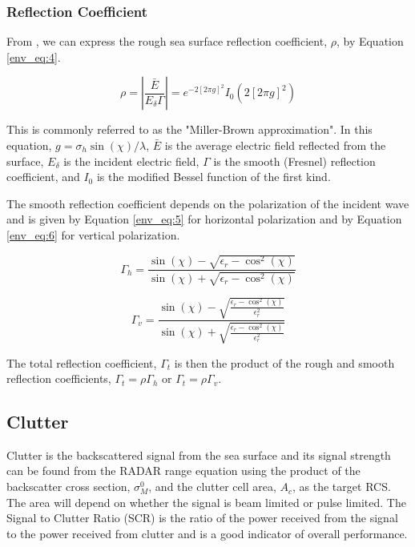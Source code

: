 \subsubsection{Reflection Coefficient}\label{section_reflection_coefficient}
From \cite{miller_reflection}, we can express the rough sea surface reflection coefficient, $\rho$, by Equation \ref{env_eq:4}. 

  \begin{equation}
  \label{env_eq:4}
\rho = \left|\frac{\bar{E}}{E_\delta \Gamma} \right| = e^{-2\left[2\pi g \right]^2}I_0\left( 2\left[2\pi g \right]^2\right) 
\end{equation}
\renewcommand{\baselinestretch}{2} \small\normalsize

This is commonly referred to as the "Miller-Brown approximation". In this equation, $g = \sigma_h\sin(\chi)/\lambda$, $\bar{E}$ is the average electric field reflected from the surface, $E_\delta$ is the incident electric field, $\Gamma$ is the smooth (Fresnel) reflection coefficient, and $I_0$ is the modified Bessel function of the first kind.

The smooth reflection coefficient depends on the polarization of the incident wave and is given by Equation \ref{env_eq:5} for horizontal polarization and by Equation \ref{env_eq:6} for vertical polarization.

  \begin{equation}
  \label{env_eq:5}
 \Gamma_h = \frac{\sin(\chi)- \sqrt{\epsilon_r - \cos^2(\chi)}}{\sin(\chi) + \sqrt{\epsilon_r - \cos^2(\chi)}}
  \end{equation}
  \renewcommand{\baselinestretch}{2} \small\normalsize
  
  \begin{equation}
  \label{env_eq:6}
 \Gamma_v = \frac{\sin(\chi)- \sqrt{\frac{\epsilon_r - \cos^2(\chi)}{\epsilon_r^2}}}{\sin(\chi) + \sqrt{\frac{\epsilon_r - \cos^2(\chi)}{\epsilon_r^2}}}
  \end{equation}
  \renewcommand{\baselinestretch}{2} \small\normalsize
  
The total reflection coefficient, $\Gamma_t$ is then the product of the rough and smooth reflection coefficients, $\Gamma_t = \rho\Gamma_h$ or $\Gamma_t = \rho\Gamma_v$.

\subsection{Clutter}
Clutter is the backscattered signal from the sea surface and its signal strength can be found from the RADAR range equation using the product of the backscatter cross section, $\sigma_M^0$, and the clutter cell area, $A_c$, as the target RCS. The area will depend on whether the signal is beam limited or pulse limited. The Signal to Clutter Ratio (SCR) is the ratio of the power received from the signal to the power received from clutter and is a good indicator of overall performance.

